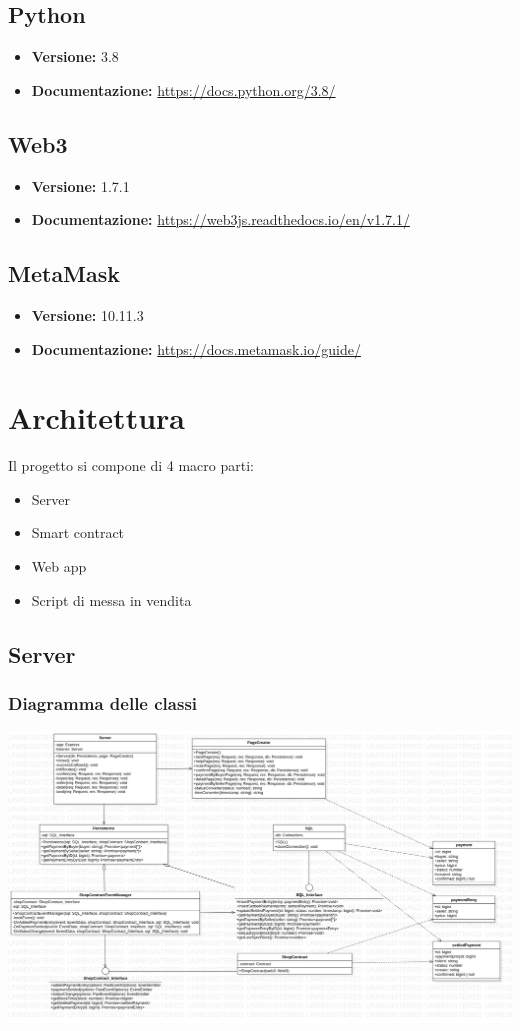 \documentclass[a4paper, 12pt]{article}
\begin{document}
\subsection{Python}
\begin{itemize}
\item \textbf{Versione:} 3.8
\item \textbf{Documentazione:} \href{https://docs.python.org/3.8/}{https://docs.python.org/3.8/}
\end{itemize}

\subsection{Web3}
\begin{itemize}
\item \textbf{Versione:} 1.7.1
\item \textbf{Documentazione:} \href{https://web3js.readthedocs.io/en/v1.7.1/}{https://web3js.readthedocs.io/en/v1.7.1/}
\end{itemize}

\subsection{MetaMask}
\begin{itemize}
\item \textbf{Versione:} 10.11.3
\item \textbf{Documentazione:} \href{https://docs.metamask.io/guide/}{https://docs.metamask.io/guide/}
\end{itemize}
\clearpage
\section{Architettura}
Il progetto si compone di 4 macro parti:
\begin{itemize}
\item Server
\item Smart contract
\item Web app
\item Script di messa in vendita
\end{itemize}
\subsection{Server}
\subsubsection{Diagramma delle classi}
\includegraphics[width=1.0\textwidth]{server_class}
\end{document}
